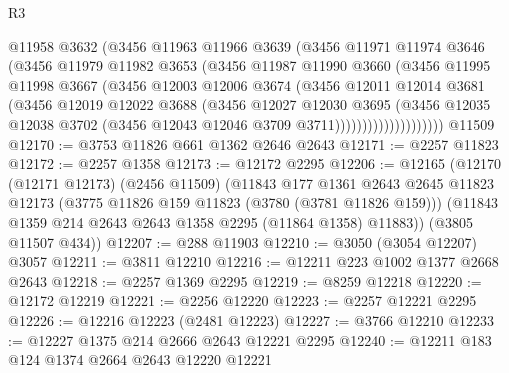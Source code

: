 \begin{lexlean}{R3}
\begin{coremodule}
                      @11958
                      @3632
                      (@3456
                        @11963
                        @11966
                        @3639
                        (@3456
                          @11971
                          @11974
                          @3646
                          (@3456
                            @11979
                            @11982
                            @3653
                            (@3456
                              @11987
                              @11990
                              @3660
                              (@3456
                                @11995
                                @11998
                                @3667
                                (@3456
                                  @12003
                                  @12006
                                  @3674
                                  (@3456
                                    @12011
                                    @12014
                                    @3681
                                    (@3456
                                      @12019
                                      @12022
                                      @3688
                                      (@3456
                                        @12027
                                        @12030
                                        @3695
                                        (@3456
                                          @12035
                                          @12038
                                          @3702
                                          (@3456 @12043 @12046 @3709 @3711))))))))))))))))))))
    @11509
@12170 := @3753 @11826 @661 @1362 @2646 @2643
@12171 := @2257 @11823
@12172 := @2257 @1358
@12173 := @12172 @2295
@12206 := @12165
    (@12170
      (@12171 @12173)
      (@2456 @11509)
      (@11843
        @177
        @1361
        @2643
        @2645
        @11823
        @12173
        (@3775 @11826 @159 @11823 (@3780 (@3781 @11826 @159)))
        (@11843 @1359 @214 @2643 @2643 @1358 @2295 (@11864 @1358) @11883))
      (@3805 @11507 @434))
@12207 := @288 @11903
@12210 := @3050 (@3054 @12207) @3057
@12211 := @3811 @12210
@12216 := @12211 @223 @1002 @1377 @2668 @2643
@12218 := @2257 @1369 @2295
@12219 := @8259 @12218
@12220 := @12172 @12219
@12221 := @2256 @12220
@12223 := @2257 @12221 @2295
@12226 := @12216 @12223 (@2481 @12223)
@12227 := @3766 @12210
@12233 := @12227 @1375 @214 @2666 @2643 @12221 @2295
@12240 := @12211 @183 @124 @1374 @2664 @2643 @12220 @12221

\end{coremodule}
\end{lexlean}

